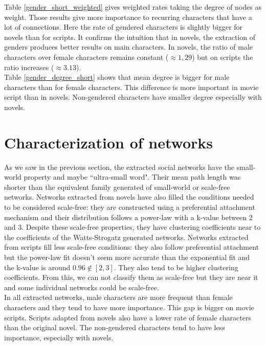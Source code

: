 \documentclass[a4paper, 12pt]{report}
\begin{document}
Table \ref{gender_short_weighted} gives weighted rates taking the degree of nodes as weight. Those results give more importance to recurring characters that have a lot of connections. Here the rate of gendered characters is slightly bigger for novels than for scripts. It confirms the intuition that in novels, the extraction of genders produces better results on main characters. In novels, the ratio of male characters over female characters remains constant ($\approx 1,29$) but on scripts the ratio increases ($\approx 3.13$).\\

Table \ref{gender_degree_short} shows that mean degree is bigger for male characters than for female characters. This difference is more important in movie script than in novels. Non-gendered characters have smaller degree especially with novels.


\section{Characterization of networks}
\label{char}

As we saw in the previous section, the extracted social networks have the small-world property and maybe ``ultra-small word". Their mean path length was shorter than the equivalent family generated of small-world or scale-free networks. Networks extracted from novels have also filled the conditions needed to be considered scale-free: they are constructed using a preferential attachment mechanism and their distribution follows a power-law with a k-value between 2 and 3. Despite these scale-free properties, they have clustering coefficients near to the coefficients of the Watts-Strogatz generated networks. Networks extracted from scripts fill less scale-free conditions: they also follow preferential attachment but the power-law fit doesn't seem more accurate than the exponential fit and the k-value is around $0.96 \notin [2,3]$. They also tend to be higher clustering coefficients. From this, we can not classify them as scale-free but they are near it and some individual networks could be scale-free.\\

In all extracted networks, male characters are more frequent than female characters and they tend to have more importance. This gap is bigger on movie scripts. Scripts adapted from novels also have a lower rate of female characters than the original novel. The non-gendered characters tend to have less importance, especially with novels.
\end{document}
